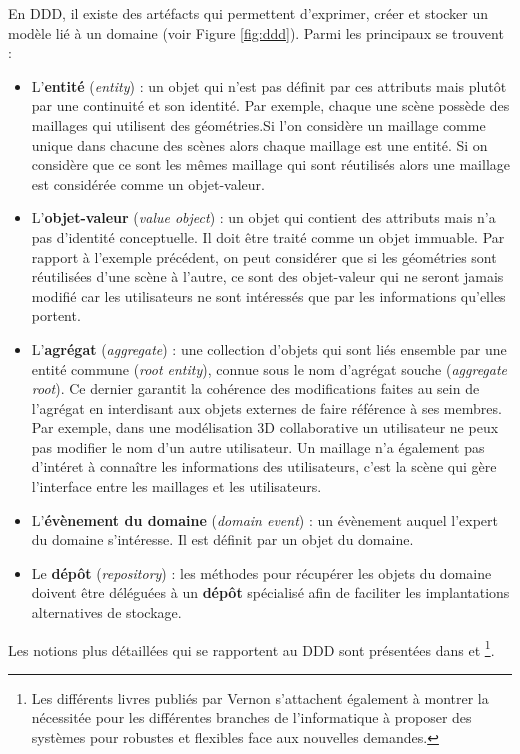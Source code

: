 En \gls{DDD}, il existe des artéfacts qui permettent d'exprimer, créer et stocker un 
modèle lié à un domaine (voir Figure \ref{fig:ddd}). Parmi les principaux se trouvent 
:
\begin{itemize}
	\item L'\textbf{entité} (\textit{entity}) : un objet qui n'est pas définit par ces 
	attributs 
	mais plutôt par une continuité et son identité. 
	Par exemple, chaque une scène possède des maillages qui utilisent des 
	géométries.Si l'on 
	considère un maillage comme unique dans chacune des scènes alors chaque 
	maillage est une entité. Si on considère que ce sont les mêmes maillage qui 
	sont réutilisés alors une maillage est considérée comme un objet-valeur.
	
	\item L'\textbf{objet-valeur} (\textit{value object}) : un objet qui contient des 
	attributs 
	mais n'a pas d'identité conceptuelle. Il doit être traité comme un objet
	immuable. Par rapport à l'exemple précédent, on peut considérer que si les 
	géométries sont réutilisées d'une scène à l'autre, ce sont des objet-valeur qui 
	ne seront jamais modifié car les utilisateurs ne sont intéressés que par les 
	informations qu'elles portent.
	
	\item L'\textbf{agrégat} (\textit{aggregate}) : une collection d'objets qui sont 
	liés 
	ensemble par une entité commune (\textit{root entity}), connue sous le nom 
	d'agrégat souche (\textit{aggregate root}). Ce dernier garantit la cohérence des 
	modifications faites au sein de l'agrégat en interdisant aux objets externes de 
	faire référence à ses membres. Par exemple, dans une modélisation 3D 
	collaborative un utilisateur ne peux pas modifier le nom d'un autre utilisateur. Un 
	maillage n'a également pas d'intéret à connaître les informations des 
	utilisateurs, c'est la scène qui gère l'interface entre les maillages et les 
	utilisateurs.
	\item L'\textbf{évènement du domaine} (\textit{domain event}) : un 
	évènement auquel 
	l'expert du domaine s'intéresse. Il est définit par un objet du domaine.
	\item Le \textbf{dépôt} (\textit{repository}) : les méthodes pour récupérer les 
	objets du domaine doivent être déléguées à un \textbf{dépôt} spécialisé afin de 
	faciliter les implantations 
	alternatives de stockage.
\end{itemize}



Les notions plus détaillées qui se rapportent au \gls{DDD} sont présentées dans 
\cite{Evans2003} et \cite{Vernon2013}\footnote{Les différents livres publiés par 
Vernon s'attachent également à montrer la nécessitée pour les différentes 
branches de l'informatique à proposer des 
systèmes pour robustes et flexibles face aux nouvelles demandes. }.

